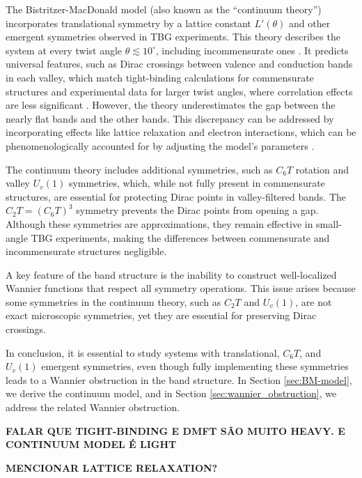The Bistritzer-MacDonald model (also known as the ``continuum theory'') incorporates translational symmetry by a lattice constant $L'(\theta)$ and other emergent symmetries observed in TBG experiments. This theory describes the system at every twist angle $\theta \lesssim 10^\circ$, including incommensurate ones \cite{continuum_model_castroneto2007, macdonald2011}. It predicts universal features, such as Dirac crossings between valence and conduction bands in each valley, which match tight-binding calculations for commensurate structures and experimental data for larger twist angles, where correlation effects are less significant \cite{zou2018}. However, the theory underestimates the gap between the nearly flat bands and the other bands. This discrepancy can be addressed by incorporating effects like lattice relaxation and electron interactions, which can be phenomenologically accounted for by adjusting the model's parameters \cite{koshinohubbard2018}.

The continuum theory includes additional symmetries, such as \(C_6 T\) rotation and valley \(U_v(1)\) symmetries, which, while not fully present in commensurate structures, are essential for protecting Dirac points in valley-filtered bands. The \(C_2 T = (C_6 T)^3\) symmetry prevents the Dirac points from opening a gap. Although these symmetries are approximations, they remain effective in small-angle TBG experiments, making the differences between commensurate and incommensurate structures negligible.

A key feature of the band structure is the inability to construct well-localized Wannier functions that respect all symmetry operations. This issue arises because some symmetries in the continuum theory, such as \(C_2 T\) and \(U_v(1)\), are not exact microscopic symmetries, yet they are essential for preserving Dirac crossings.

In conclusion, it is essential to study systems with translational, \(C_6 T\), and \(U_v(1)\) emergent symmetries, even though fully implementing these symmetries leads to a Wannier obstruction in the band structure. In Section \ref{sec:BM-model}, we derive the continuum model, and in Section \ref{sec:wannier_obstruction}, we address the related Wannier obstruction.

\textbf{FALAR QUE TIGHT-BINDING E DMFT SÃO MUITO HEAVY. E CONTINUUM MODEL É LIGHT}

\textbf{MENCIONAR LATTICE RELAXATION?}

